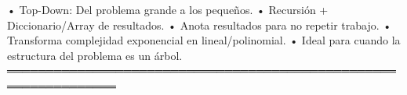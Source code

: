 \begin{dsaentrevistas}

\end{dsaentrevistas}
\begin{dsaresumen}
• Top-Down: Del problema grande a los pequeños.
• Recursión + Diccionario/Array de resultados.
• Anota resultados para no repetir trabajo.
• Transforma complejidad exponencial en lineal/polinomial.
• Ideal para cuando la estructura del problema es un árbol.
════════════════════════════════════════════════════════════════
\end{dsaresumen}

